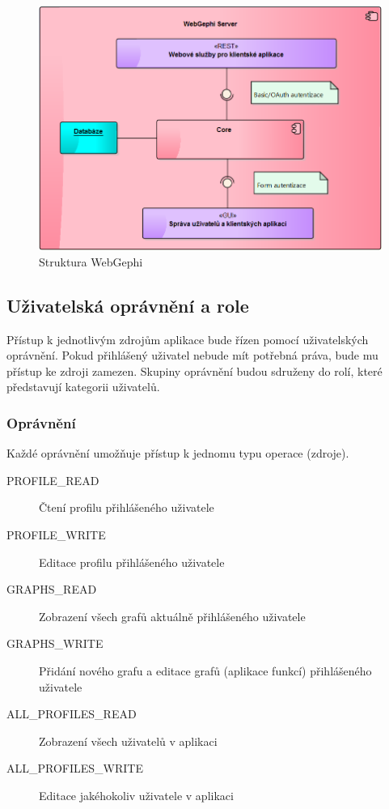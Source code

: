 \documentclass[thesis=M,czech]{FITthesis}[2014/05/6]
\begin{document}
\begin{figure}\centering
 	\includegraphics[width=1\textwidth]{images/diagram/server-auth}
 	\caption[Struktura WebGephi]{Struktura WebGephi}\label{fig:server-auth}
\end{figure}

\subsection{Uživatelská oprávnění a role}
Přístup k jednotlivým zdrojům aplikace bude řízen pomocí uživatelských oprávnění. Pokud přihlášený uživatel nebude mít potřebná práva,
bude mu přístup ke zdroji zamezen. Skupiny oprávnění budou sdruženy do rolí, které představují kategorii uživatelů.

\subsubsection{Oprávnění}
Každé oprávnění umožňuje přístup k jednomu typu operace (zdroje).
\begin{description}
  \item[PROFILE\_READ] Čtení profilu přihlášeného uživatele
  \item[PROFILE\_WRITE] Editace profilu přihlášeného uživatele
  \item[GRAPHS\_READ] Zobrazení všech grafů aktuálně přihlášeného uživatele
  \item[GRAPHS\_WRITE] Přidání nového grafu a editace grafů (aplikace funkcí) přihlášeného uživatele 
  \item[ALL\_PROFILES\_READ] Zobrazení všech uživatelů v aplikaci 
  \item[ALL\_PROFILES\_WRITE] Editace jakéhokoliv uživatele v aplikaci 
\end{description}
\end{document}
